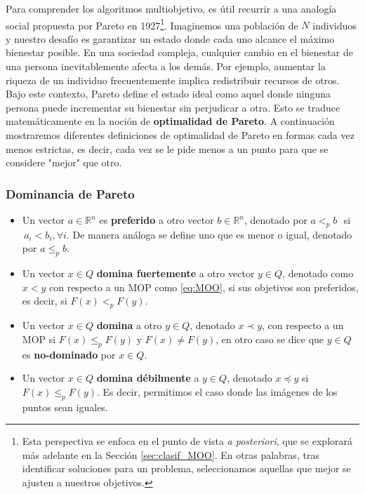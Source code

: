 Para comprender los algoritmos multiobjetivo, es útil recurrir a una analogía social propuesta por Pareto en 1927\footnote{Esta perspectiva se enfoca en el punto de vista \emph{a posteriori}, que se explorará más adelante en la Sección \ref{sec:clasif_MOO}. En otras palabras, tras identificar soluciones para un problema, seleccionamos aquellas que mejor se ajusten a nuestros objetivos.}. Imaginemos una población de $N$ individuos y nuestro desafío es garantizar un estado donde cada uno alcance el máximo bienestar posible. En una sociedad compleja, cualquier cambio en el bienestar de una persona inevitablemente afecta a los demás. Por ejemplo, aumentar la riqueza de un individuo frecuentemente implica redistribuir recursos de otros. Bajo este contexto, Pareto define el estado ideal como aquel donde ninguna persona puede incrementar su bienestar sin perjudicar a otra. Esto se traduce matemáticamente en la noción de \textbf{optimalidad de Pareto}. A continuación mostraremos diferentes definiciones de optimalidad de Pareto en formas cada vez menos estrictas, es decir, cada vez se le pide menos a un punto para que se considere "mejor" que otro. 


\subsubsection*{Dominancia de Pareto}

\begin{itemize}
    \item Un vector $a\in \mathbb{R}^n$ es \textbf{preferido} a otro vector $b\in \mathbb{R}^n$, denotado por $a<_p b \, \, $ si $\, a_i <b_i, \forall i$. De manera análoga se define uno que es menor o igual, denotado por $a\leq_p b$.
    \item Un vector $x\in Q$ \textbf{domina fuertemente} a otro vector $y\in Q$, denotado como $x < y$ con respecto a un MOP como \eqref{eq:MOO}, si sus objetivos son preferidos, es decir, si $F(x) <_p F(y)$.
    \item Un vector $x\in Q$ \textbf{domina} a otro $y\in Q$, denotado $x\prec y$, con respecto a un MOP si $F(x) \leq_p F(y)$ y $F(x)\neq F(y)$, en otro caso se dice que $y\in Q$  es \textbf{no-dominado} por $x\in Q$.
    \item Un vector $x\in Q$ \textbf{domina débilmente} a $y\in Q$, denotado $x\preceq y$ si $F(x)\leq_p F(y)$. Es decir, permitimos el caso donde las imágenes de los puntos sean iguales. 
\end{itemize}

